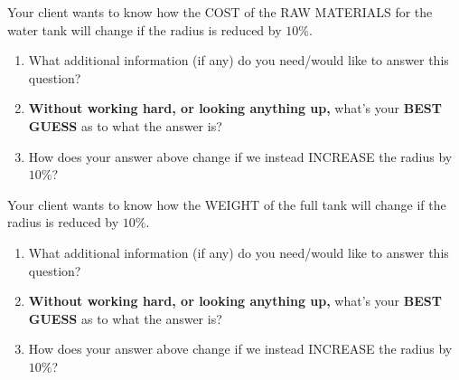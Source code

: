 \documentclass[handout,nooutcomes,noauthor]{ximera}
\begin{document}
\mynewpage


\begin{question} %
  Your client wants to know how the COST of the RAW MATERIALS for the
  water tank will change if the radius is reduced by $10\%$.
  \begin{enumerate}
  \item What additional information (if any) do you need/would like
    to answer this question?
  \item \textbf{Without working hard, or looking anything up,} what's
    your \textbf{BEST GUESS} as to what the answer is?
  \item How does your answer above change if we instead INCREASE the
    radius by $10\%$?
  \end{enumerate}
\end{question}

\mynewpage


\begin{question} %
  Your client wants to know how the WEIGHT of the full tank will
  change if the radius is reduced by $10\%$.
  \begin{enumerate}
  \item What additional information (if any) do you need/would like
    to answer this question?
  \item \textbf{Without working hard, or looking anything up,} what's
    your \textbf{BEST GUESS} as to what the answer is?
  \item How does your answer above change if we instead INCREASE the
    radius by $10\%$?
  \end{enumerate}
\end{question}
\end{document}

